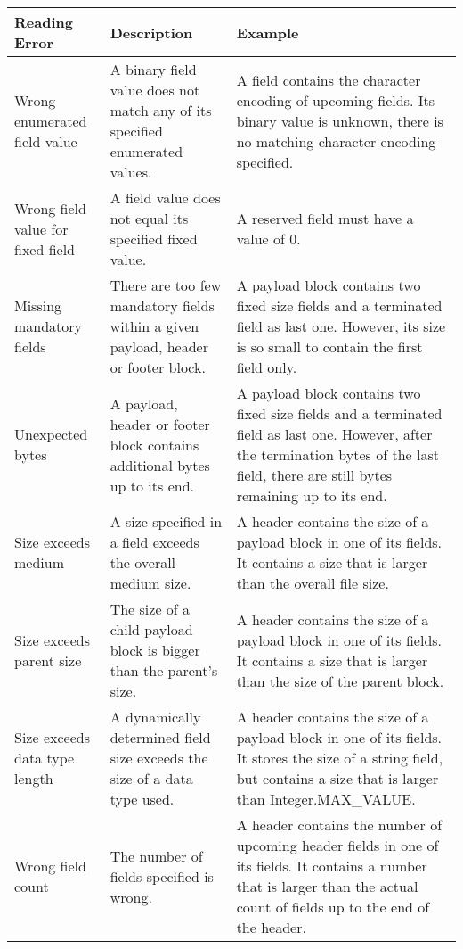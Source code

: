 \begin{longtable}{|p{}|p{}|p{}|}
	\hline
	Reading Error & Description & Example\\
	\endhead
	\hline
   Wrong enumerated field value & A binary field value does not match any of its specified enumerated values. & A field contains the character encoding of upcoming fields. Its binary value is unknown, there is no matching character encoding specified.\\
	\hline
   Wrong field value for fixed field & A field value does not equal its specified fixed value. & A reserved field must have a value of 0.\\
	\hline
   Missing mandatory fields & There are too few mandatory fields within a given payload, header  or footer block. & A payload block contains two fixed size fields and a terminated field as last one. However, its size is so small to contain the first field only.\\
	\hline
   Unexpected bytes & A payload, header or footer block contains additional bytes up to its end. & A payload block contains two fixed size fields and a terminated field as last one. However, after the termination bytes of the last field, there are still bytes remaining up to its end.\\
	\hline
   Size exceeds medium & A size specified in a field exceeds the overall medium size. & A header contains the size of a payload block in one of its fields. It contains a size that is larger than the overall file size.\\
	\hline
   Size exceeds parent size & The size of a child payload block is bigger than the parent's size. & A header contains the size of a payload block in one of its fields. It contains a size that is larger than the size of the parent block.\\
	\hline
   Size exceeds data type length & A dynamically determined field size exceeds the size of a data type used. &  A header contains the size of a payload block in one of its fields. It stores the size of a string field, but contains a size that is larger than Integer.MAX\_VALUE.\\
	\hline
   Wrong field count & The number of fields specified is wrong. & A header contains the number of upcoming header fields in one of its fields. It contains a number that is larger than the actual count of fields up to the end of the header.\\
\end{longtable}

